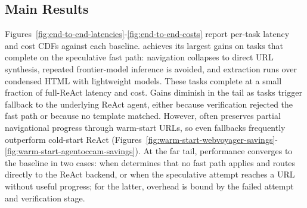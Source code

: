 


%
%



\subsection{Main Results}

Figures~\ref{fig:end-to-end-latencies}-\ref{fig:end-to-end-costs} report per-task latency and cost CDFs against each baseline. \sys achieves its largest gains on tasks that complete on the speculative fast path: navigation collapses to direct URL synthesis, repeated frontier-model inference is avoided, and extraction runs over condensed HTML with lightweight models. These tasks complete at a small fraction of full-ReAct latency and cost. Gains diminish in the tail as tasks trigger fallback to the underlying ReAct agent, either because verification rejected the fast path or because no template matched. However, \sys often preserves partial navigational progress through warm-start URLs, so even fallbacks frequently outperform cold-start ReAct (Figures~\ref{fig:warm-start-webvoyager-savings}-\ref{fig:warm-start-agentoccam-savings}). At the far tail, performance converges to the baseline in two cases: when \sys determines that no fast path applies and routes directly to the ReAct backend, or when the speculative attempt reaches a URL without useful progress; for the latter, overhead is bound by the failed attempt and verification stage.

